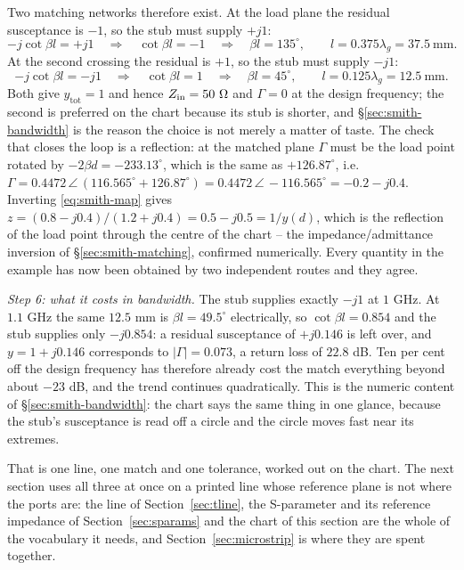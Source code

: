 Two matching networks therefore exist. At the load plane the residual susceptance is $-1$, so the stub must
supply $+j1$:
\begin{equation}
  -j\cot\beta l = +j1 \quad\Longrightarrow\quad \cot\beta l = -1 \quad\Longrightarrow\quad
  \beta l = 135^\circ , \qquad l = 0.375\lambda_g = 37.5\ \mathrm{mm} .
  \label{eq:smith-ex-stub}
\end{equation}
At the second crossing the residual is $+1$, so the stub must supply $-j1$:
\begin{equation}
  -j\cot\beta l = -j1 \quad\Longrightarrow\quad \cot\beta l = 1 \quad\Longrightarrow\quad
  \beta l = 45^\circ , \qquad l = 0.125\lambda_g = 12.5\ \mathrm{mm} .
  \label{eq:smith-ex-stub2}
\end{equation}
Both give $y_{\mathrm{tot}}=1$ and hence $Z_{\mathrm{in}}=50\ \Omega$ and $\Gamma=0$ at the design frequency; the
second is preferred on the chart because its stub is shorter, and \S\ref{sec:smith-bandwidth} is the reason the
choice is not merely a matter of taste. The check that closes the loop is a reflection: at the matched plane
$\Gamma$ must be the load point rotated by $-2\beta d=-233.13^\circ$, which is the same as
$+126.87^\circ$, i.e. $\Gamma=0.4472\,\angle\,(116.565^\circ+126.87^\circ)=0.4472\,\angle\,-116.565^\circ
=-0.2-j0.4$. Inverting \eqref{eq:smith-map} gives $z=(0.8-j0.4)/(1.2+j0.4)=0.5-j0.5=1/y(d)$, which is the
reflection of the load point through the centre of the chart -- the impedance/admittance inversion of
\S\ref{sec:smith-matching}, confirmed numerically. Every quantity in the example has now been obtained by two
independent routes and they agree.

\emph{Step 6: what it costs in bandwidth.} The stub supplies exactly $-j1$ at $1$ GHz. At $1.1$ GHz the same
$12.5$ mm is $\beta l=49.5^\circ$ electrically, so $\cot\beta l=0.854$ and the stub supplies only $-j0.854$: a
residual susceptance of $+j0.146$ is left over, and $y=1+j0.146$ corresponds to
$|\Gamma|=0.073$, a return loss of $22.8$ dB. Ten per cent off the design frequency has therefore already cost
the match everything beyond about $-23$ dB, and the trend continues quadratically. This is the numeric content of
\S\ref{sec:smith-bandwidth}: the chart says the same thing in one glance, because the stub's susceptance is read
off a circle and the circle moves fast near its extremes.

That is one line, one match and one tolerance, worked out on the chart. The next section uses all three at once
on a printed line whose reference plane is not where the ports are: the line of Section~\ref{sec:tline}, the
S-parameter and its reference impedance of Section~\ref{sec:sparams} and the chart of this section are the
whole of the vocabulary it needs, and Section~\ref{sec:microstrip} is where they are spent together.
